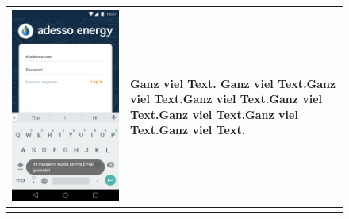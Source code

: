 \begin{figure}[h]
\begin{tabularx}{\textwidth}{X | X}
	\includegraphics[scale = 0.22]{img/AndroidMockup/forgotPassword} & Ganz viel Text. Ganz viel Text.Ganz viel Text.Ganz viel Text.Ganz viel Text.Ganz viel Text.Ganz viel Text.Ganz viel Text. \\ \hline \\

\end{tabularx}
\end{figure}
